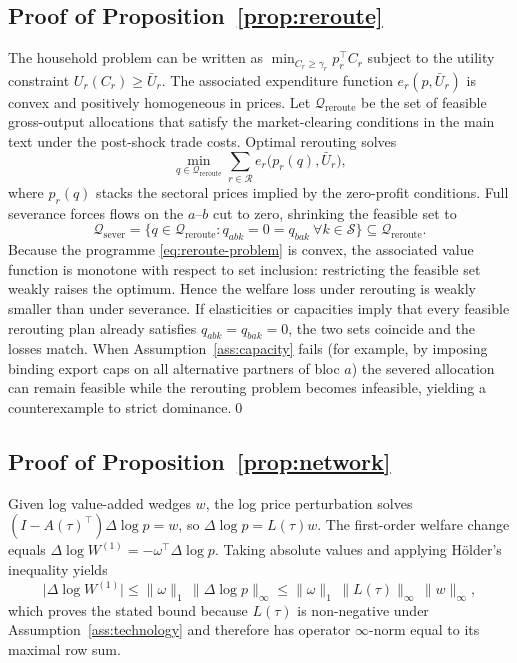 \subsection{Proof of Proposition~\ref{prop:reroute}}
The household problem can be written as $\min_{C_r \geq \gamma_r} p_r^{\top} C_r$ subject to the utility constraint $U_r(C_r) \geq \bar{U}_r$. The associated expenditure function $e_r(p, \bar{U}_r)$ is convex and positively homogeneous in prices. Let $\mathcal{Q}_{\mathrm{reroute}}$ be the set of feasible gross-output allocations that satisfy the market-clearing conditions in the main text under the post-shock trade costs. Optimal rerouting solves
\begin{equation}
\label{eq:reroute-problem}
\min_{q \in \mathcal{Q}_{\mathrm{reroute}}} \sum_{r \in \mathcal{R}} e_r\bigl(p_r(q), \bar{U}_r\bigr),
\end{equation}
where $p_r(q)$ stacks the sectoral prices implied by the zero-profit conditions. Full severance forces flows on the $a$--$b$ cut to zero, shrinking the feasible set to
\begin{equation*}
\mathcal{Q}_{\mathrm{sever}} = \bigl\{q \in \mathcal{Q}_{\mathrm{reroute}} : q_{abk} = 0 = q_{bak}\ \forall k \in \mathcal{S}\bigr\} \subseteq \mathcal{Q}_{\mathrm{reroute}}.
\end{equation*}
Because the programme \eqref{eq:reroute-problem} is convex, the associated value function is monotone with respect to set inclusion: restricting the feasible set weakly raises the optimum. Hence the welfare loss under rerouting is weakly smaller than under severance. If elasticities or capacities imply that every feasible rerouting plan already satisfies $q_{abk}=q_{bak}=0$, the two sets coincide and the losses match. When Assumption~\ref{ass:capacity} fails (for example, by imposing binding export caps on all alternative partners of bloc $a$) the severed allocation can remain feasible while the rerouting problem becomes infeasible, yielding a counterexample to strict dominance.\qed

\subsection{Proof of Proposition~\ref{prop:network}}
Given log value-added wedges $w$, the log price perturbation solves $(I-A(\tau)^{\top})\Delta\log p = w$, so $\Delta\log p = L(\tau)w$. The first-order welfare change equals $\Delta \log W^{(1)} = -\omega^{\top}\Delta\log p$. Taking absolute values and applying Hölder's inequality yields
\begin{equation*}
    \bigl|\Delta \log W^{(1)}\bigr| \leq \|\omega\|_{1}\,\|\Delta\log p\|_{\infty} \leq \|\omega\|_{1}\,\|L(\tau)\|_{\infty}\,\|w\|_{\infty},
\end{equation*}
which proves the stated bound because $L(\tau)$ is non-negative under Assumption~\ref{ass:technology} and therefore has operator $\infty$-norm equal to its maximal row sum.

